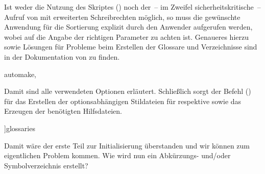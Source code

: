 \documentclass[%
  english,ngerman,%
  cdgeometry=no,DIV=12,%
  automark,%
  listof=toc,%
]{tudscrartcl}
\begin{document}
Ist weder die Nutzung des Skriptes () 
noch der~-- im Zweifel sicherheitskritische~-- Aufruf von  mit 
erweiterten Schreibrechten möglich, so muss die gewünschte Anwendung für die 
Sortierung explizit durch den Anwender aufgerufen werden, wobei auf die Angabe 
der richtigen Parameter zu achten ist. Genaueres hierzu sowie Lösungen für 
Probleme beim Erstellen der Glossare und Verzeichnisse sind in der Dokumentation
von  zu finden.
%
\begin{Hint}
  automake,%
\end{Hint}
%
Damit sind alle verwendeten Optionen erläutert. Schließlich sorgt der Befehl 
() für das Erstellen der 
optionsabhängigen Stildateien für  respektive 
 sowie das Erzeugen der benötigten Hilfsdateien.
%
\begin{Preamble}
]{glossaries}
\makeglossaries
\end{Preamble}
\begin{Preamble+}
}%

\AfterPackage*{glossaries}{%
\end{Preamble+}
%
Damit wäre der erste Teil zur Initialisierung überstanden und wir können zum 
eigentlichen Problem kommen. Wie wird nun ein Abkürzungs- und/oder 
Symbolverzeichnis erstellt?
\end{document}
